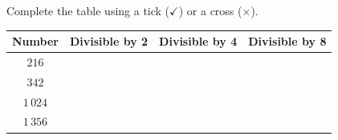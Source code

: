  Complete the table using a tick ($\checkmark$) or a cross ($\times$).
\par\finishquestion

\begin{center}
\begin{tabular}{|c|c|c|c|}
\hline
\textbf{Number} & \textbf{Divisible by 2} & \textbf{Divisible by 4} & \textbf{Divisible by 8}\\
\hline
$216$ & & &\\ \hline
$342$ & & &\\ \hline
$1\,024$ & & &\\ \hline
$1\,356$ & & &\\ \hline
\end{tabular}
\end{center}
